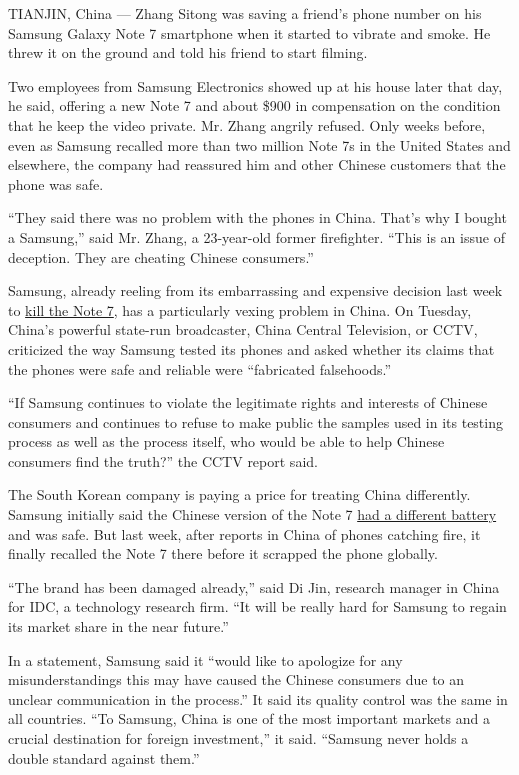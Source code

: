 TIANJIN, China --- Zhang Sitong was saving a friend's phone number on
his Samsung Galaxy Note 7 smartphone when it started to vibrate and
smoke. He threw it on the ground and told his friend to start filming.

Two employees from Samsung Electronics showed up at his house later that
day, he said, offering a new Note 7 and about \$900 in compensation on
the condition that he keep the video private. Mr. Zhang angrily refused.
Only weeks before, even as Samsung recalled more than two million Note
7s in the United States and elsewhere, the company had reassured him and
other Chinese customers that the phone was safe.

``They said there was no problem with the phones in China. That's why I
bought a Samsung,'' said Mr. Zhang, a 23-year-old former firefighter.
``This is an issue of deception. They are cheating Chinese consumers.''

Samsung, already reeling from its embarrassing and expensive decision
last week to
\href{http://www.nytimes3xbfgragh.onion/2016/10/12/business/international/samsung-galaxy-note7-terminated.html}{kill
the Note 7}, has a particularly vexing problem in China. On Tuesday,
China's powerful state-run broadcaster, China Central Television, or
CCTV, criticized the way Samsung tested its phones and asked whether its
claims that the phones were safe and reliable were ``fabricated
falsehoods.''

``If Samsung continues to violate the legitimate rights and interests of
Chinese consumers and continues to refuse to make public the samples
used in its testing process as well as the process itself, who would be
able to help Chinese consumers find the truth?'' the CCTV report said.

The South Korean company is paying a price for treating China
differently. Samsung initially said the Chinese version of the Note 7
\href{http://www.nytimes3xbfgragh.onion/2016/09/03/business/samsung-galaxy-note-battery.html}{had
a different battery} and was safe. But last week, after reports in China
of phones catching fire, it finally recalled the Note 7 there before it
scrapped the phone globally.

``The brand has been damaged already,'' said Di Jin, research manager in
China for IDC, a technology research firm. ``It will be really hard for
Samsung to regain its market share in the near future.''

In a statement, Samsung said it ``would like to apologize for any
misunderstandings this may have caused the Chinese consumers due to an
unclear communication in the process.'' It said its quality control was
the same in all countries. ``To Samsung, China is one of the most
important markets and a crucial destination for foreign investment,'' it
said. ``Samsung never holds a double standard against them.''

